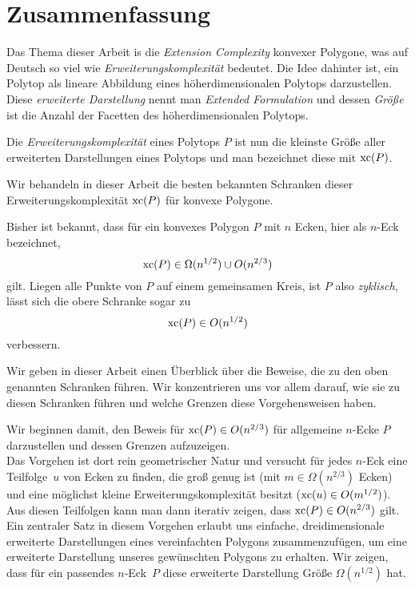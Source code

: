 \section*{Zusammenfassung}

Das Thema dieser Arbeit is die \emph{Extension Complexity} konvexer Polygone, was auf Deutsch so viel wie \emph{Erweiterungskomplexität} bedeutet. Die Idee dahinter ist, ein Polytop als lineare Abbildung eines höherdimensionalen Polytops darzustellen. Diese \emph{erweiterte Darstellung} nennt man \emph{Extended Formulation} und dessen \emph{Größe} ist die Anzahl der Facetten des höherdimensionalen Polytops.

Die \emph{Erweiterungskomplexität} eines Polytops $P$ ist nun die kleinste Größe aller erweiterten Darstellungen eines Polytops und man bezeichnet diese mit $\operatorname{xc}(P)$.

Wir behandeln in dieser Arbeit die besten bekannten Schranken dieser Erweiterungskomplexität $\operatorname{xc}(P)$ für konvexe Polygone. 

Bisher ist bekannt, dass für ein konvexes Polygon $P$ mit $n$ Ecken, hier als $n$-Eck bezeichnet, $$\operatorname{xc}(P) \in \Omega(n^{1/2}) \cup O(n^{2/3})$$ gilt. Liegen alle Punkte von $P$ auf einem gemeinsamen Kreis, ist $P$ also \emph{zyklisch}, lässt sich die obere Schranke sogar zu $$\operatorname{xc}(P) \in O(n^{1/2})$$ verbessern.

Wir geben in dieser Arbeit einen Überblick über die Beweise, die zu den oben genannten Schranken führen. Wir konzentrieren uns vor allem darauf, wie sie zu diesen Schranken führen und welche Grenzen diese Vorgehensweisen haben.

Wir beginnen damit, den Beweis für $\operatorname{xc}(P) \in O(n^{2/3})$ für allgemeine $n$-Ecke $P$ darzustellen und dessen Grenzen aufzuzeigen.\\
Das Vorgehen ist dort rein geometrischer Natur und versucht für jedes $n$-Eck eine Teilfolge~$u$ von Ecken zu finden, die groß genug ist (mit $m \in \Omega(n^{2/3})$ Ecken) und eine möglichst kleine Erweiterungskomplexität besitzt ($\operatorname{xc}(u) \in O(m^{1/2})$). Aus diesen Teilfolgen kann man dann iterativ zeigen, dass $\operatorname{xc}(P) \in O(n^{2/3})$ gilt.\\
Ein zentraler Satz in diesem Vorgehen erlaubt uns einfache, dreidimensionale erweiterte Darstellungen eines vereinfachten Polygons zusammenzufügen, um eine erweiterte Darstellung unseres gewünschten Polygons zu erhalten. Wir zeigen, dass für ein passendes \mbox{$n$-Eck $P$} diese erweiterte Darstellung Größe $\Omega(n^{1/2})$ hat.

